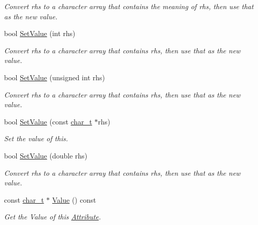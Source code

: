 \begin{DoxyCompactItemize}
\begin{DoxyCompactList}\small\item\em Convert rhs to a character array that contains the meaning of rhs, then use that as the new value. \item\end{DoxyCompactList}\item 
bool \hyperlink{classphys_1_1xml_1_1Attribute_a693f7bd8015866c3c4979101c343ce50}{SetValue} (int rhs)
\begin{DoxyCompactList}\small\item\em Convert rhs to a character array that contains rhs, then use that as the new value. \item\end{DoxyCompactList}\item 
bool \hyperlink{classphys_1_1xml_1_1Attribute_a289ac36b218f3912224fd904ccade1ed}{SetValue} (unsigned int rhs)
\begin{DoxyCompactList}\small\item\em Convert rhs to a character array that contains rhs, then use that as the new value. \item\end{DoxyCompactList}\item 
bool \hyperlink{classphys_1_1xml_1_1Attribute_a470512fcd8b4f7609319bf85df100aaa}{SetValue} (const \hyperlink{namespacephys_1_1xml_afc87705cd1c2917d87b879715a2d8f6e}{char\_\-t} $\ast$rhs)
\begin{DoxyCompactList}\small\item\em Set the value of this. \item\end{DoxyCompactList}\item 
bool \hyperlink{classphys_1_1xml_1_1Attribute_a919034671f61ee408d616409a49dafca}{SetValue} (double rhs)
\begin{DoxyCompactList}\small\item\em Convert rhs to a character array that contains rhs, then use that as the new value. \item\end{DoxyCompactList}\item 
const \hyperlink{namespacephys_1_1xml_afc87705cd1c2917d87b879715a2d8f6e}{char\_\-t} $\ast$ \hyperlink{classphys_1_1xml_1_1Attribute_a8a8099b39bca8894a8226ce0e82d3451}{Value} () const 
\begin{DoxyCompactList}\small\item\em Get the Value of this \hyperlink{classphys_1_1xml_1_1Attribute}{Attribute}. \item\end{DoxyCompactList}\end{DoxyCompactItemize}
